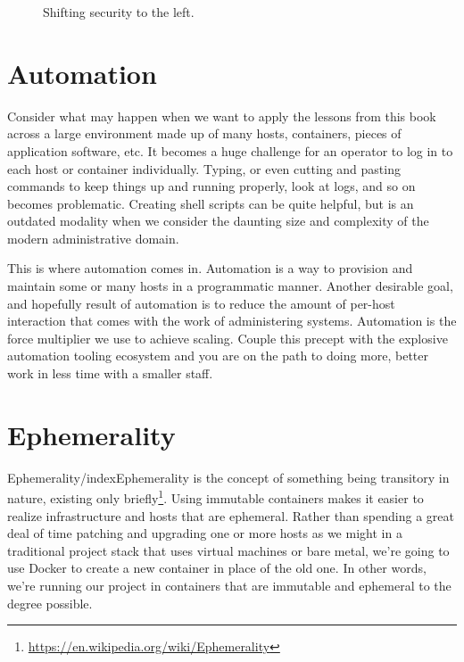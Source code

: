 \justify
\begin{figure}[!htb]
	\centering
	\caption{Shifting security to the left.}
	\label{fig:shift}
\end{figure}

\section{Automation}

\justify
Consider what may happen when we want to apply the lessons from this book across a large environment made up of many hosts, containers, pieces of application software, etc. It becomes a huge challenge for an operator to log in to each host or container individually. Typing, or even cutting and pasting commands to keep things up and running properly, look at logs, and so on becomes problematic. Creating shell scripts can be quite helpful, but is an outdated modality when we consider the daunting size and complexity of the modern administrative domain.

\justify
This is where automation comes in. Automation is a way to provision and maintain some or many hosts in a programmatic manner. Another desirable goal, and hopefully result of automation is to reduce the amount of per-host interaction that comes with the work of administering systems. Automation is the force multiplier we use to achieve scaling. Couple this precept with the explosive automation tooling ecosystem and you are on the path to doing more, better work in less time with a smaller staff. 

\section{Ephemerality}

\justify
Ephemerality/index{Ephemerality} is the concept of something being transitory in nature,
existing only briefly\footnote{\url{https://en.wikipedia.org/wiki/Ephemerality}}.
Using immutable containers makes it easier to realize infrastructure and
hosts that are ephemeral. Rather than spending a great deal of time
patching and upgrading one or more hosts as we might in a traditional
project stack that uses virtual machines or bare metal, we're going to
use Docker to create a new container in place of the old one. In other
words, we're running our project in containers that are immutable and
ephemeral to the degree possible.

